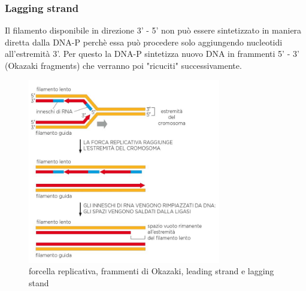             \subsubsection{Lagging strand}
                Il filamento disponibile in direzione 3' - 5' non può essere sintetizzato in maniera diretta dalla DNA-P perchè essa può procedere solo aggiungendo nucleotidi all'estremità 3'. Per questo la DNA-P sintetizza nuovo DNA in frammenti 5' - 3' (Okazaki fragments) che verranno poi "ricuciti" successivamente.
            
            \begin{figure}[h]
                \centering
                \includegraphics[width=0.75\textwidth]{images/forcellareplicativa.JPG}
                \caption{\small forcella replicativa, frammenti di Okazaki, leading strand e lagging stand}
                \label{fig:mesh1}
            \end{figure}
        
